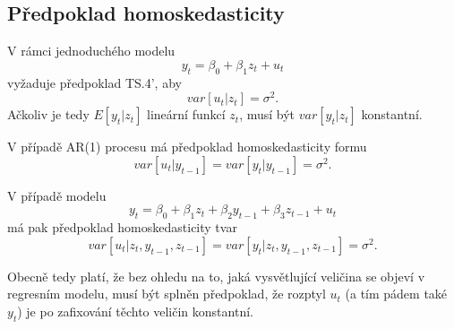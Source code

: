 \subsection{Předpoklad homoskedasticity}

V rámci jednoduchého modelu
\begin{equation}
y_t = \beta_0 + \beta_1 z_t + u_t
\end{equation}
vyžaduje předpoklad TS.4', aby
\begin{equation}
var[u_t|z_t] = \sigma^2.
\end{equation}
Ačkoliv je tedy $E[y_t|z_t]$ lineární funkcí $z_t$, musí být $var[y_t|z_t]$ konstantní.

V případě AR(1) procesu má předpoklad homoskedasticity formu
\begin{equation}
var[u_t | y_{t - 1}] = var[y_t | y_{t - 1}] = \sigma^2.
\end{equation}

V případě modelu
\begin{equation}
y_t = \beta_0 + \beta_1 z_t + \beta_2 y_{t - 1} + \beta_3 z_{t - 1} + u_t
\end{equation}
má pak předpoklad homoskedasticity tvar
\begin{equation}
var[u_t | z_t, y_{t - 1}, z_{t - 1}] = var[y_t|z_t, y_{t - 1}, z_{t - 1}] = \sigma^2.
\end{equation}

Obecně tedy platí, že bez ohledu na to, jaká vysvětlující veličina se objeví v regresním modelu, musí být splněn předpoklad, že rozptyl $u_t$ (a tím pádem také $y_t$) je po zafixování těchto veličin konstantní.
